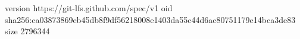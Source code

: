 version https://git-lfs.github.com/spec/v1
oid sha256:ca03873869eb45db8f9df56218008e1403da55c44d6ac80751179e14bca3de83
size 2796344
